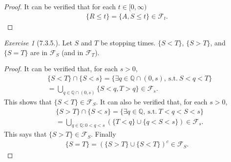 \documentclass[12pt,a4paper]{amsart}
\theoremstyle{plain}
\theoremstyle{definition}
\theoremstyle{remark}
\newtheorem*{exe}{Exercise}
\numberwithin{equation}{section}
\begin{document}
\begin{proof}
It can be verified that for each $t\in [0,\infty)$
  \begin{align}
\{R \leq t\} = \{A, S \leq t\} \in \mathcal F_t.
  \end{align}
\end{proof}
\begin{exe}[7.3.5.]
Let $S$ and $T$ be stopping times. 
$\{S < T\}$, $\{S > T\}$, and $\{ S = T\}$ are in $\mathcal F_S$ (and in $\mathcal F_T$).
\end{exe}
\begin{proof}
It can be verified that, for each $s> 0$,
\begin{align}
&\{S < T\} \cap \{S < s\} = \{\exists q \in \mathbb Q \cap (0,s),~ \text{s.t.}~S < q < T \}
\\&= \bigcup_{q\in \mathbb Q \cap(0,s)} \{ S < q, T>q\} 
\in \mathcal F_s.
\end{align}
This shows that $\{S < T\}\in \mathcal F_S$.
It can also be verified that, for each $s>0$,
\begin{align}
&\{S > T\} \cap \{S < s\} 
= \{\exists q \in \mathbb Q,~ \text{s.t.}~T < q < S < s\}
\\&= \bigcup_{q\in \mathbb Q:0 < q < s}\left(\{ T < q \} \cup \{q<S<s\}\right) 
\in \mathcal F_s. 
\end{align}
This says that $\{S> T\}\in \mathcal F_S$. Finally
\begin{align}
  \{S = T\} = \left( \{S>T\} \cup \{S< T\} \right)^c \in \mathcal F_S.
\end{align}
\end{proof}
\end{document}
